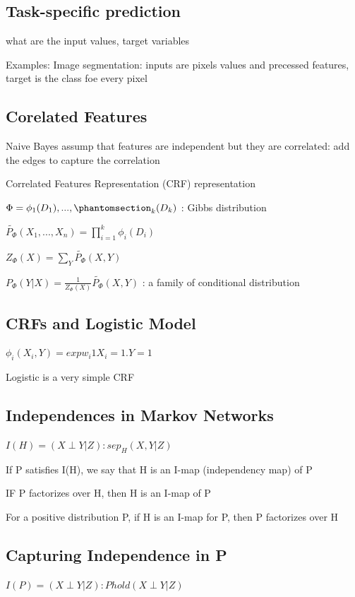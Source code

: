 \documentclass{book}
\begin{document}
\subsection{Task-specific prediction}
what are the input values, target variables

Examples: Image segmentation: inputs are pixels values and precessed features, target is the class foe every pixel

\subsection{Corelated Features}

Naive Bayes assump that features are independent but they are correlated: add the edges to capture the correlation

Correlated Features Representation (CRF) representation 

$\Phi = {\phi_1(D_1),...,\phantomsection_k(D_k)}$ : Gibbs distribution

$\widetilde{P_{\Phi}}(X_1,..., X_n) = \prod_{i=1}^{k} \phi_i(D_i)$

$Z_{\Phi}(X) = \sum_{Y} \widetilde{P_{\Phi}}(X,Y)$

$P_{\Phi}(Y|X) = \frac{1}{Z_{\Phi}(X)}  \widetilde{P_{\Phi}}(X,Y) $ : a family of conditional distribution

\subsection{CRFs and Logistic Model}
$\phi_i(X_i,Y) = exp{w_i 1{X_i=1.Y=1}}$

Logistic is a very simple CRF


\subsection{Independences in Markov Networks}
$ I(H) = {(X \perp Y | Z) : sep_H(X,Y | Z)}$

If P satisfies I(H), we say that H is an I-map (independency map) of P

IF P factorizes over H, then H is an I-map of P

For a positive distribution P, if H is an I-map for P, then P factorizes over H

\subsection{Capturing Independence in P}
 $I(P) = {(X \perp Y | Z) : P hold (X \perp Y | Z)} $
 
\end{document}

